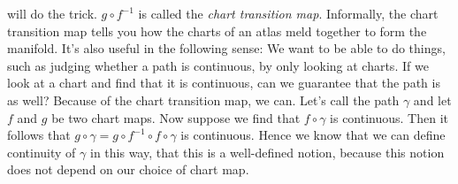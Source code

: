 will do the trick.
$g\circ f^{-1}$ is called the {\it chart transition map}.
Informally, the chart transition map tells you how the charts of an atlas meld
together to form the manifold. It's also useful in the following sense: We
want to be able to do things, such as judging whether a path is continuous, by
only looking at charts. If we look at a chart and find that it is continuous,
can we guarantee that the path is as well? Because of the chart transition
map, we can. Let's call the path $\gamma$ and let $f$ and $g$ be two chart
maps. Now suppose we find that $f\circ\gamma$ is continuous. Then it follows
that $g\circ\gamma=g\circ f^{-1}\circ f\circ\gamma$ is continuous. Hence we 
know that we can define continuity of $\gamma$ in this way, that this is a
well-defined notion, because this notion does not depend on our choice of
chart map.

